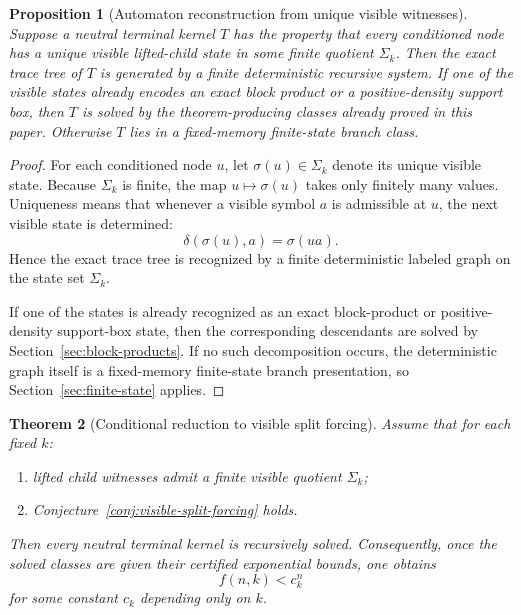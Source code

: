 \documentclass[11pt]{article}
\newtheorem{theorem}{Theorem}[section]
\newtheorem{proposition}[theorem]{Proposition}
\theoremstyle{definition}
\newcommand{\1}{\mathbf{1}}
\begin{document}
\begin{proposition}[Automaton reconstruction from unique visible witnesses]\label{prop:visible-automaton-reconstruction}
Suppose a neutral terminal kernel $T$ has the property that every conditioned node has a unique visible lifted-child state in some finite quotient $\Sigma_k$.
Then the exact trace tree of $T$ is generated by a finite deterministic recursive system.
If one of the visible states already encodes an exact block product or a positive-density support box, then $T$ is solved by the theorem-producing classes already proved in this paper.
Otherwise $T$ lies in a fixed-memory finite-state branch class.
\end{proposition}

\begin{proof}
For each conditioned node $u$, let $\sigma(u)\in \Sigma_k$ denote its unique visible state.
Because $\Sigma_k$ is finite, the map $u\mapsto \sigma(u)$ takes only finitely many values.
Uniqueness means that whenever a visible symbol $a$ is admissible at $u$, the next visible state is determined:
\[
\delta(\sigma(u),a)=\sigma(ua).
\]
Hence the exact trace tree is recognized by a finite deterministic labeled graph on the state set $\Sigma_k$.

If one of the states is already recognized as an exact block-product or positive-density support-box state, then the corresponding descendants are solved by Section~\ref{sec:block-products}.
If no such decomposition occurs, the deterministic graph itself is a fixed-memory finite-state branch presentation, so Section~\ref{sec:finite-state} applies.
\end{proof}

\begin{theorem}[Conditional reduction to visible split forcing]\label{thm:visible-split-reduction}
Assume that for each fixed $k$:
\begin{enumerate}[label=(\roman*),leftmargin=2.2em]
\item lifted child witnesses admit a finite visible quotient $\Sigma_k$;
\item Conjecture~\ref{conj:visible-split-forcing} holds.
\end{enumerate}
Then every neutral terminal kernel is recursively solved.
Consequently, once the solved classes are given their certified exponential bounds, one obtains
\[
f(n,k)<c_k^n
\]
for some constant $c_k$ depending only on $k$.
\end{theorem}
\end{document}
